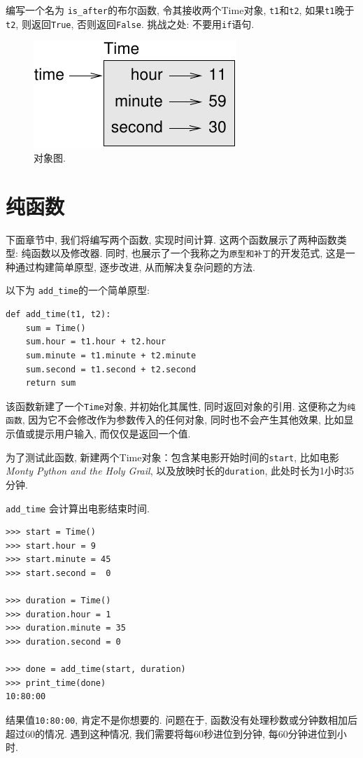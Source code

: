 \documentclass[10pt]{book}
\begin{document}
编写一个名为 \verb"is_after"的布尔函数, 
令其接收两个Time对象, {\tt t1}和{\tt t2}, 
如果{\tt t1}晚于{\tt t2}, 则返回{\tt True}, 否则返回{\tt False}. 
挑战之处: 不要用{\tt if}语句. 

\begin{figure}
\centerline
{\includegraphics[scale=0.8]{figs/time.pdf}}
\caption{对象图.}
\label{fig.time}
\end{figure}


\section{纯函数}

下面章节中, 我们将编写两个函数, 实现时间计算. 
这两个函数展示了两种函数类型: 纯函数以及修改器. 
同时, 也展示了一个我称之为{\tt 原型和补丁}的开发范式, 
这是一种通过构建简单原型, 逐步改进, 从而解决复杂问题的方法. 

以下为 \verb"add_time"的一个简单原型:

\begin{verbatim}
def add_time(t1, t2):
    sum = Time()
    sum.hour = t1.hour + t2.hour
    sum.minute = t1.minute + t2.minute
    sum.second = t1.second + t2.second
    return sum
\end{verbatim}
%
该函数新建了一个{\tt Time}对象, 并初始化其属性, 同时返回对象的引用. 
这便称之为{\tt 纯函数}, 因为它不会修改作为参数传入的任何对象, 
同时也不会产生其他效果, 比如显示值或提示用户输入, 而仅仅是返回一个值. 

为了测试此函数, 新建两个Time对象：包含某电影开始时间的{\tt start}, 
比如电影{\em Monty Python and the Holy Grail},  
以及放映时长的{\tt duration}, 此处时长为1小时35分钟. 

\verb"add_time" 会计算出电影结束时间. 

\begin{verbatim}
>>> start = Time()
>>> start.hour = 9
>>> start.minute = 45
>>> start.second =  0

>>> duration = Time()
>>> duration.hour = 1
>>> duration.minute = 35
>>> duration.second = 0

>>> done = add_time(start, duration)
>>> print_time(done)
10:80:00
\end{verbatim}
%
结果值{\tt 10:80:00}, 肯定不是你想要的. 
问题在于, 函数没有处理秒数或分钟数相加后超过60的情况. 
遇到这种情况, 我们需要将每60秒进位到分钟, 
每60分钟进位到小时. 
\end{document}

